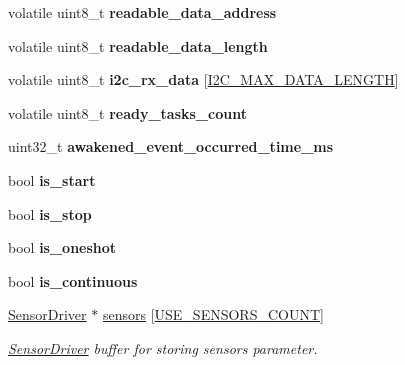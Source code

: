 \begin{DoxyCompactItemize}
volatile uint8\+\_\+t {\bfseries readable\+\_\+data\+\_\+address}
\item 
\mbox{\label{i2c-th_8h_a9f8745963db0221dc148ea1f8b2a32db}} 
volatile uint8\+\_\+t {\bfseries readable\+\_\+data\+\_\+length}
\item 
\mbox{\label{i2c-th_8h_aded715a916f3df4c1fb8cfde69ebfee8}} 
volatile uint8\+\_\+t {\bfseries i2c\+\_\+rx\+\_\+data} \mbox{[}\hyperlink{hardware__config_8h_aa552d72ce15dd8ca167c4b9323f1f25d}{I2\+C\+\_\+\+M\+A\+X\+\_\+\+D\+A\+T\+A\+\_\+\+L\+E\+N\+G\+TH}\mbox{]}
\item 
\mbox{\label{i2c-th_8h_ab51900c214aadb930a66e4581a5d205e}} 
volatile uint8\+\_\+t {\bfseries ready\+\_\+tasks\+\_\+count}
\item 
\mbox{\label{i2c-th_8h_a78178f418362740f92f9e8b16aebb380}} 
uint32\+\_\+t {\bfseries awakened\+\_\+event\+\_\+occurred\+\_\+time\+\_\+ms}
\item 
\mbox{\label{i2c-th_8h_a0437e68459618830effdd71d4d1da252}} 
bool {\bfseries is\+\_\+start}
\item 
\mbox{\label{i2c-th_8h_a75c1bec124f2bc00d40f269a6171d06f}} 
bool {\bfseries is\+\_\+stop}
\item 
\mbox{\label{i2c-th_8h_aad5fc763cd3b23392848902b82a22636}} 
bool {\bfseries is\+\_\+oneshot}
\item 
\mbox{\label{i2c-th_8h_adf47c3770ad7ac0b29836365ad1e9164}} 
bool {\bfseries is\+\_\+continuous}
\item 
\hyperlink{classSensorDriver}{Sensor\+Driver} $\ast$ \hyperlink{i2c-th_8h_ac07b59f913caef2eaea4e4bb93c901e9}{sensors} \mbox{[}\hyperlink{rmap-config_8h_af18dc3de744722cb308451b7a705611b}{U\+S\+E\+\_\+\+S\+E\+N\+S\+O\+R\+S\+\_\+\+C\+O\+U\+NT}\mbox{]}
\begin{DoxyCompactList}\small\item\em \hyperlink{classSensorDriver}{Sensor\+Driver} buffer for storing sensors parameter. \end{DoxyCompactList}\item 
\mbox{\label{i2c-th_8h_a7727577f63dfa4aa55feb7ddd0739f83}} 

\end{DoxyCompactItemize}

